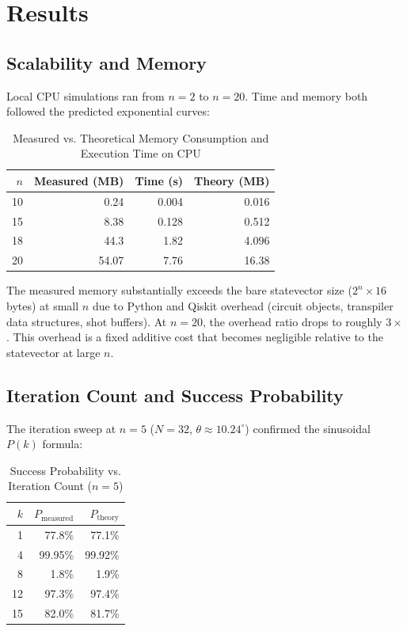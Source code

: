 \documentclass[sigconf, authorversion, nonacm]{acmart}
\begin{document}
\section{Results}

\subsection{Scalability and Memory}

Local CPU simulations ran from $n=2$ to $n=20$. Time and memory both followed the predicted exponential curves:

\begin{table}[htbp]
\centering
\caption{Measured vs. Theoretical Memory Consumption and Execution Time on CPU}
\label{tab:scalability}
\begin{tabular}{rrrr}
\toprule
$n$ & Measured (MB) & Time (s) & Theory (MB) \\
\midrule
10 & 0.24  & 0.004 & 0.016 \\
15 & 8.38  & 0.128 & 0.512 \\
18 & 44.3  & 1.82  & 4.096 \\
20 & 54.07 & 7.76  & 16.38 \\
\bottomrule
\end{tabular}
\end{table}

The measured memory substantially exceeds the bare statevector size ($2^n \times 16$ bytes) at small $n$ due to Python and Qiskit overhead (circuit objects, transpiler data structures, shot buffers). At $n=20$, the overhead ratio drops to roughly $3\times$. This overhead is a fixed additive cost that becomes negligible relative to the statevector at large $n$.

\subsection{Iteration Count and Success Probability}

The iteration sweep at $n=5$ ($N=32$, $\theta \approx 10.24^\circ$) confirmed the sinusoidal $P(k)$ formula:

\begin{table}[htbp]
\centering
\caption{Success Probability vs. Iteration Count ($n=5$)}
\label{tab:iterations}
\begin{tabular}{rrr}
\toprule
$k$ & $P_{\text{measured}}$ & $P_{\text{theory}}$ \\
\midrule
1 & 77.8\% & 77.1\% \\
4 & 99.95\% & 99.92\% \\
8 & 1.8\%  & 1.9\%  \\
12 & 97.3\% & 97.4\% \\
15 & 82.0\% & 81.7\% \\
\bottomrule
\end{tabular}
\end{table}
\end{document}
